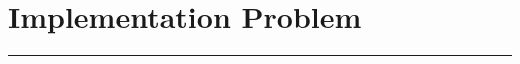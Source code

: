 \documentclass{article}
\begin{document}


\section*{Implementation Problem}
\noindent\rule{\textwidth}{1pt}\vspace{0.75mm}

\end{document}
